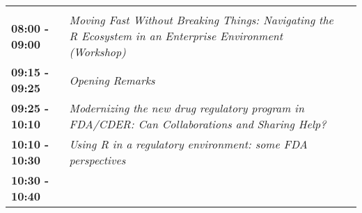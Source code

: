 \documentclass[]{book}
\theoremstyle{definition}
\theoremstyle{definition}
\theoremstyle{definition}
\theoremstyle{remark}
\begin{document}
\begin{longtable}[]{@{}lll@{}}
\begin{minipage}[t]{0.30\columnwidth}
\strut
\end{minipage}\tabularnewline
\begin{minipage}[t]{0.30\columnwidth}\raggedright
\textbf{08:00 - 09:00}\strut
\end{minipage} & \begin{minipage}[t]{0.30\columnwidth}\raggedright
\emph{Moving Fast Without Breaking Things: Navigating the R Ecosystem in
an Enterprise Environment (Workshop)}\strut
\end{minipage} & \begin{minipage}[t]{0.30\columnwidth}\raggedright
\strut
\end{minipage}\tabularnewline
\begin{minipage}[t]{0.30\columnwidth}\raggedright
\textbf{09:15 - 09:25}\strut
\end{minipage} & \begin{minipage}[t]{0.30\columnwidth}\raggedright
\emph{Opening Remarks}\strut
\end{minipage} & \begin{minipage}[t]{0.30\columnwidth}\raggedright
\strut
\end{minipage}\tabularnewline
\begin{minipage}[t]{0.30\columnwidth}\raggedright
\textbf{09:25 - 10:10}\strut
\end{minipage} & \begin{minipage}[t]{0.30\columnwidth}\raggedright
\emph{Modernizing the new drug regulatory program in FDA/CDER: Can
Collaborations and Sharing Help?}\strut
\end{minipage} & \begin{minipage}[t]{0.30\columnwidth}\raggedright
\strut
\end{minipage}\tabularnewline
\begin{minipage}[t]{0.30\columnwidth}\raggedright
\textbf{10:10 - 10:30}\strut
\end{minipage} & \begin{minipage}[t]{0.30\columnwidth}\raggedright
\emph{Using R in a regulatory environment: some FDA perspectives}\strut
\end{minipage} & \begin{minipage}[t]{0.30\columnwidth}\raggedright
\strut
\end{minipage}\tabularnewline
\begin{minipage}[t]{0.30\columnwidth}\raggedright
\textbf{10:30 - 10:40}\strut
\end{minipage} & \begin{minipage}[t]{0.30\columnwidth}\raggedright

\end{minipage}
\end{longtable}
\end{document}
